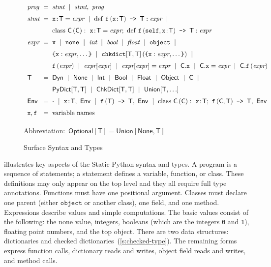 \documentclass[english,cleveref,submission]{programming}
\makeatletter
\newcommand{\SP}{Static Python}
\newcommand{\code}[1]{\texttt{#1}}
\newcommand{\defeq}{=}
\newcommand{\langmid}{~\mid~} %
\newenvironment{langarray}{\(\def\arraystretch{1.5}\begin{array}{l@{\hspace{2mm}}c@{\hspace{2mm}}l}}{\end{array}\)}
\newcommand{\spapp}[2]{#1\,(#2)}
\newcommand{\spann}[2]{#1\!:\!#2}
\newcommand{\typefont}[1]{\mathsf{#1}}
\newcommand{\codefont}[1]{\emph{#1}}
\newcommand{\paramtype}[2]{#1[#2]}
\newcommand{\sptype}{\typefont{T}}
\newcommand{\sptclass}{\typefont{C}}
\newcommand{\sptint}{\typefont{Int}}
\newcommand{\sptbool}{\typefont{Bool}}
\newcommand{\sptfloat}{\typefont{Float}}
\newcommand{\sptdyn}{\typefont{Dyn}}
\newcommand{\sptobject}{\typefont{Object}}
\newcommand{\sptnone}{\typefont{None}}
\newcommand{\sptoptional}[1]{\paramtype{\typefont{Optional}}{#1}}
\newcommand{\sptunion}[1]{\paramtype{\typefont{Union}}{#1}}
\newcommand{\sptrawpydict}{\typefont{PyDict}}
\newcommand{\sptpydict}[2]{\paramtype{\sptrawpydict}{#1, #2}}
\newcommand{\sptchkdict}[2]{\paramtype{\typefont{ChkDict}}{#1, #2}}
\newcommand{\sptenv}{\typefont{Env}}
\newcommand{\sptenvnil}{\cdot}
\newcommand{\sptvardef}[2]{\spann{#1}{#2}}
\newcommand{\sptfundef}[3]{\spapp{#1}{#2}\code{ -> }#3}
\newcommand{\sptclassdef}[4]{\mathrm{class}~\spapp{#1}{#2}:~#3;~#4}
\newcommand{\spx}{\code{x}}
\newcommand{\spf}{\code{f}}
\newcommand{\spc}{\sptclass}
\newcommand{\spprog}{\codefont{prog}}
\newcommand{\spstmt}{\codefont{stmt}}
\newcommand{\spexpr}{\codefont{expr}}
\newcommand{\spvardef}[3]{\sptvardef{#1}{#2} = #3}
\newcommand{\spfundef}[4]{\mathrm{def}~\spapp{#1}{#2}\code{ -> }#3: #4}
\newcommand{\spclassdef}[4]{\mathrm{class}~\spapp{#1}{#2}:~#3;~#4}
\newcommand{\spself}{\code{self}}
\newcommand{\spobject}{\code{object}}
\newcommand{\spnone}{\code{none}}
\newcommand{\spint}{\codefont{int}}
\newcommand{\spbool}{\codefont{bool}}
\newcommand{\spfloat}{\codefont{float}}
\newcommand{\sppydict}[1]{\code{\{}#1\code{\}}}
\newcommand{\spchkdict}[3]{\spapp{\paramtype{\code{chkdict}}{#1, #2}}{#3}}
\newcommand{\spdictref}[2]{#1[#2]}
\newcommand{\spdictset}[3]{\spdictref{#1}{#2} = #3}
\newcommand{\spobjref}[2]{#1.#2}
\newcommand{\spobjset}[3]{\spobjref{#1}{#2} = #3}
\newcommand{\spobjapp}[3]{\spobjref{#1}{\spapp{#2}{#3}}}
\makeatother
\begin{document}
\begin{figure}[t]
  \begin{langarray}
    \spprog & \defeq &
      \spstmt \langmid \spstmt,~\spprog
  \\
    \spstmt & \defeq &
      \spvardef{\spx}{\sptype}{\spexpr} \langmid
      \spfundef{\spf}{\spann{\spx}{\sptype}}{\sptype}{\spexpr} \langmid
  \\ & &
      \spclassdef{\spc}{\spc}{\spvardef{\spx}{\sptype}{\spexpr}}{\spfundef{\spf}{\spself, \spann{\spx}{\sptype}}{\sptype}{\spexpr}}
  \\
    \spexpr & \defeq &
      \spx \langmid \spnone \langmid \spint \langmid \spbool \langmid \spfloat \langmid \spobject \langmid
  \\ & &
      \sppydict{\spx: \spexpr, \ldots} \langmid
      \spchkdict{\sptype}{\sptype}{\sppydict{\spx: \spexpr, \ldots}} \langmid
  \\ & &
      \spapp{\spf}{\spexpr} \langmid
      \spdictref{\spexpr}{\spexpr} \langmid
      \spdictset{\spexpr}{\spexpr}{\spexpr} \langmid
      \spobjref{\spc}{\spx} \langmid
      \spobjset{\spc}{\spx}{\spexpr} \langmid
      \spobjapp{\spc}{\spf}{\spexpr}
  \\
    \sptype & \defeq &
      \sptdyn \langmid
      \sptnone \langmid
      \sptint \langmid
      \sptbool \langmid
      \sptfloat \langmid
      \sptobject \langmid
      \sptclass \langmid
  \\ & &
      \sptpydict{\sptype}{\sptype} \langmid
      \sptchkdict{\sptype}{\sptype} \langmid
      \sptunion{\sptype, \ldots}
  \\
    \sptenv & \defeq &
      \sptenvnil \langmid
      \sptvardef{\spx}{\sptype},~\sptenv \langmid
      \sptfundef{\spf}{\sptype}{\sptype},~\sptenv \langmid
      \sptclassdef{\spc}{\spc}{\sptvardef{\spx}{\sptype}}{\sptfundef{\spf}{\sptclass, \sptype}{\sptype}},~\sptenv
  \\
    \spx, \spf & \defeq & \mbox{variable names}
  \end{langarray}

  \bigskip
  \mbox{Abbreviation: $\sptoptional{\sptype} \defeq \sptunion{\sptnone, \sptype}$}

  \caption{Surface Syntax and Types}
  \label{f:surface-types}
\end{figure}

 illustrates key aspects of the \SP{} syntax and types.
A program is a sequence of statements;
a statement defines a variable, function, or class.
These definitions may only appear on the top level
and they all require full type annotations.
Functions must have one positional argument.
Classes must declare one parent (either $\spobject$ or another class), one field, and one method.
Expressions describe values and simple computations.
The basic values consist of the following: the none value, integers,
booleans (which are the integers \code{0} and \code{1}), floating point numbers, and the top object.
There are two data structures: dictionaries and checked dictionaries~(\cref{s:checked-type}).
The remaining forms express function calls, dictionary reads and writes, object field reads and writes,
and method calls.
\end{document}
